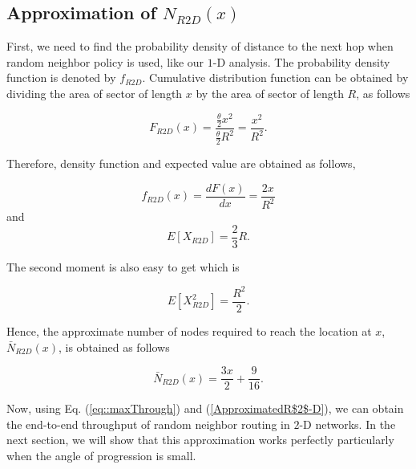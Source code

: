 \documentclass[12pt, draftclsnofoot, onecolumn]{IEEEtran}
\begin{document}
\subsection{Approximation of $N_{R2D}(x)$}

First, we need to find the probability density of distance to 
the next hop when random neighbor policy is used, like our 
$1$-D analysis. The probability density function is denoted by 
$f_{R2D}$. Cumulative distribution function can be obtained 
by dividing the area of sector of length $x$ by the area of sector 
of length $R$, as follows

\begin{equation}
	F_{R2D}(x) = \frac{\frac{\theta}{2}x^2} {\frac{\theta}{2}R^2} = \frac{x^2}{R^2}.
\end{equation}

Therefore, density function and expected value are obtained as follows,

\begin{equation}
	f_{R2D}(x) = \frac{dF(x)}{dx} = \frac{2x}{R^2}
\end{equation}
and
\begin{equation}
	E[X_{R2D}] = \frac{2}{3}R.
\end{equation}

The second moment is also easy to get which is

\begin{equation}
	E[X^2_{R2D}] = \frac{R^2}{2}.
\end{equation}

Hence, the approximate number of nodes required to reach the location 
at $x$, $\bar{N}_{R2D}(x)$, is obtained as follows

\begin{equation}
\label{ApproximatedR$2$-D}
	\bar{N}_{R2D}(x) = \frac{3x}{2} + \frac{9}{16}.
\end{equation}

Now, using Eq. (\ref{eq::maxThrough}) and (\ref{ApproximatedR$2$-D}), 
we can obtain the end-to-end throughput of random neighbor routing in 
$2$-D networks. In the next section, we will show that this approximation 
works perfectly particularly when the angle of progression is small.
\end{document}
